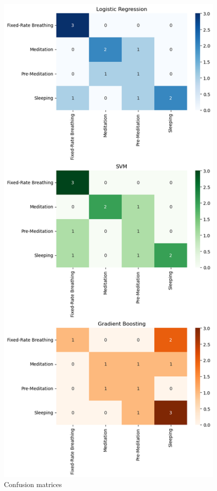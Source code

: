 \documentclass[
  11pt,
]{ieee}
\begin{document}
\begin{figure}

{\centering \includegraphics{picture_use_ml/11_Confusion_Matrices_ Logistic_Regressio_SVM_Gradient_Boosting.png}

}

\caption{Confusion matrices}

\end{figure}%
\end{document}
